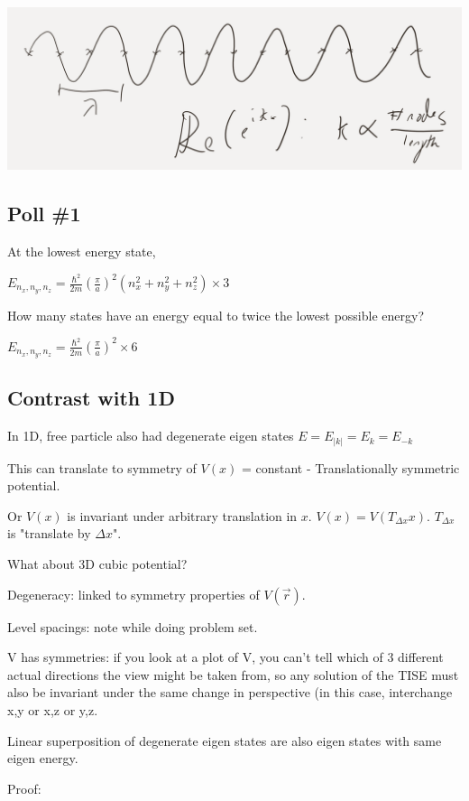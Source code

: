 \documentclass{article}
\begin{document}
\includegraphics[width = 0.9 \textwidth]{Lecture19/2.png}

\subsection{Poll \#1}

At the lowest energy state, 

$E_{n_x, n_y, n_z} = \frac{\hbar^2}{2m} \left( \frac{\pi}{a} \right)^2 (n_x^2 + n_y^2 + n_z^2) \times 3$

How many states have an energy equal to twice the lowest possible energy?

$E_{n_x, n_y, n_z} = \frac{\hbar^2}{2m} \left( \frac{\pi}{a} \right)^2 \times 6$

\subsection{Contrast with 1D}

In 1D, free particle also had degenerate eigen states $E = E_{|k|} = E_k = E_{-k}$

This can translate to symmetry of $V(x)$ = constant - Translationally symmetric potential. 

Or $V(x)$ is invariant under arbitrary translation in $x$. $V(x) = V(T_{\Delta x} x)$. $T_{\Delta x}$ is "translate by $\Delta x$". 

What about 3D cubic potential?

Degeneracy: linked to symmetry properties of $V(\vec{r})$. 

Level spacings: note while doing problem set. 

V has symmetries: if you look at a plot of V, you can’t tell which of 3 different actual directions the view might be taken from, so any solution of the TISE must also be invariant under the same change in perspective (in this case, interchange x,y or x,z or y,z.

Linear superposition of degenerate eigen states are also eigen states with same eigen energy. 

Proof: 
\end{document}
